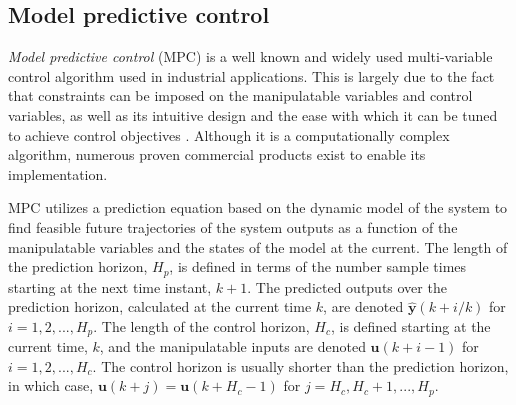 \subsection{Model predictive control}

\textit{Model predictive control} (MPC) is a well known and widely used multi-variable control algorithm used in industrial applications. This is largely due to the fact that constraints can be imposed on the manipulatable variables and control variables, as well as its intuitive design and the ease with which it can be tuned to achieve control objectives \citep{maciejowski_predictive_2002}. Although it is a computationally complex algorithm, numerous proven commercial products exist to enable its implementation.

MPC utilizes a prediction equation based on the dynamic model of the system to find feasible future trajectories of the system outputs as a function of the manipulatable variables and the states of the model at the current. The length of the prediction horizon, $H_p$, is defined in terms of the number sample times starting at the next time instant, $k+1$. The predicted outputs over the prediction horizon, calculated at the current time $k$, are denoted $\hat{\textbf{y}}(k+i / k)$ for $i=1,2,...,H_p$. The length of the control horizon, $H_c$, is defined starting at the current time, $k$, and the manipulatable inputs are denoted $\mathbf{u}(k+i-1)$ for $i=1,2,...,H_c$. The control horizon is usually shorter than the prediction horizon, in which case, $\mathbf{u}(k+j)=\mathbf{u}(k+H_c-1)$ for $j=H_c,H_c+1,...,H_p$.

